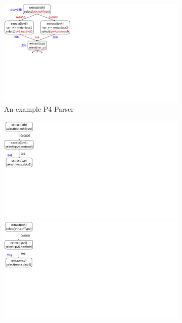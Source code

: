 \documentclass{hotnets19}
\begin{document}
\begin{figure}[!h]
    \begin{subfigure}[b]{0.3\linewidth}
        \centering
        \includegraphics[trim=4 270 596 0, clip,scale=0.4]{parser-transformation-example}
        \caption{An example P4 Parser}
        \label{subfig:parser}
    \end{subfigure}
    \begin{subfigure}[b]{0.3\linewidth}
        \centering
        \includegraphics[trim=4 285 796 0, clip,scale=0.4]{parser-example-se-1}
        \includegraphics[trim=4 285 796 0, clip,scale=0.4]{parser-example-se-2}

\end{subfigure}
\end{figure}
\end{document}
